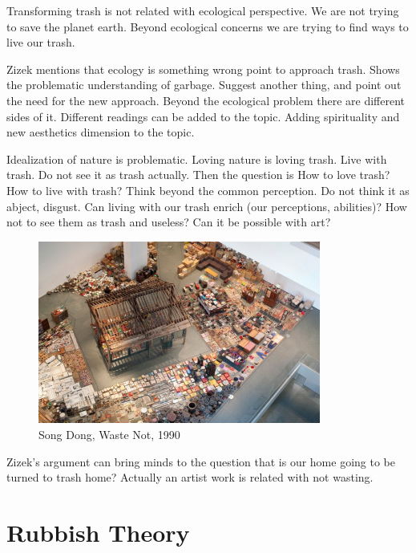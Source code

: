 Transforming trash is not related with ecological perspective. We are not trying to save the planet earth. Beyond ecological concerns we are trying to find ways to live our trash. 

Zizek mentions that ecology is something wrong point to approach trash. Shows the problematic understanding of garbage. Suggest another thing, and point out the need for the new approach. Beyond the ecological problem there are different sides of it. Different readings can be added to the topic. Adding spirituality and new aesthetics dimension to the topic. 

Idealization of nature is problematic. Loving nature is loving trash. Live with trash. Do not see it as trash actually. Then the question is How to love trash? How to live with trash? Think beyond the common perception. Do not think it as abject, disgust. Can living with our trash enrich (our perceptions, abilities)? How not to see them as trash and useless? Can it be possible with art?

\begin{figure}[h!]
  \centering
  \includegraphics[height=6cm]{graphics/SongDong_WasteNot.jpg}
  \caption{Song Dong, Waste Not, 1990}
  \label{fig:SongDong_WasteNot}
\end{figure}

Zizek's argument can bring minds to the question that is our home going to be turned to trash home? Actually an artist work is related with not wasting. 





%
%
\section{Rubbish Theory}


